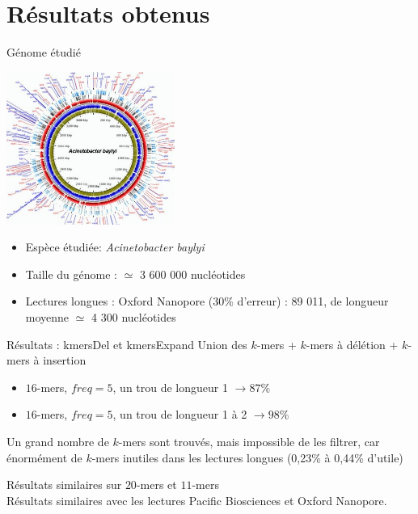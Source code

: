 \documentclass[11pt]{beamer}
\begin{document}
\section{Résultats obtenus}
\begin{frame}[fragile]{Génome étudié}
  \begin{center}
    \includegraphics[height=50mm]{acineto}
  \end{center}
  \begin{itemize}[<+-| alert@+>]
    \item Espèce étudiée: \textit{Acinetobacter baylyi}
    \item Taille du génome : $\simeq$ 3 600 000 nucléotides
    \item Lectures longues : Oxford Nanopore (30\% d'erreur) : 89 011, de longueur moyenne $\simeq$ 4 300 nucléotides
  \end{itemize}
\end{frame}
\begin{frame}[fragile]{Résultats : kmersDel et kmersExpand}
  Union des $\textit{k}$-mers + $\textit{k}$-mers à délétion + $\textit{k}$-mers à insertion\medskip\\\pause
  \begin{itemize}[<+-| alert@+>]
    \item $16$-mers, $freq = 5$, un trou de longueur 1 $\rightarrow 87\%$
    \item $16$-mers, $freq = 5$, un trou de longueur 1 à 2 $\rightarrow 98\%$
  \end{itemize}\pause
  Un grand nombre de $\textit{k}$-mers sont trouvés, mais impossible de les filtrer, car énormément de $k$-mers inutiles dans les lectures longues (0,23\% à 0,44\% d'utile)\medskip\\\pause

  Résultats similaires sur $20$-mers et $11$-mers\medskip\pause\\
  Résultats similaires avec les lectures Pacific Biosciences et Oxford Nanopore.
\end{frame}
\end{document}

